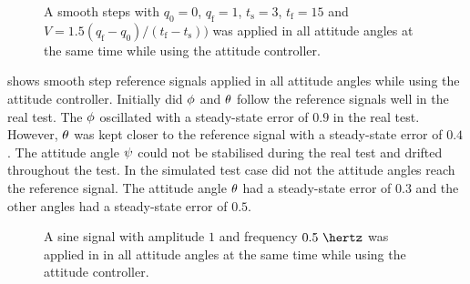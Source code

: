 \begin{figure}
\centering
  \qquad
  \qquad
  \qquad
  \qquad
  \qquad
  \caption{\label{fig:StepAllAttitude}%
 A smooth steps with $q_{\text{0}} = 0$, $q_{\text{f}} = 1$, $t_{\text{s}} = 3$, $t_{\text{f}} = 15$ and $V = 1.5 (q_{\text{f}} - q_{\text{0}})/(t_{\text{f}} - t_{\text{s}}))$ was applied in all attitude angles at the same time while using the attitude controller.}
\end{figure}

 shows smooth step reference signals applied in all attitude angles while using the attitude controller. Initially did $\phi$ and $\theta$ follow the reference signals well in the real test. The $\phi$ oscillated with a steady-state error of $0.9$ in the real test. However, $\theta$ was kept closer to the reference signal with a steady-state error of $0.4$. The attitude angle $\psi$ could not be stabilised during the real test and drifted throughout the test. In the simulated test case did not the attitude angles reach the reference signal. The attitude angle $\theta$ had a steady-state error of $0.3$ and the other angles had a steady-state error of $0.5$.

\begin{figure}
\centering
  \qquad
  \qquad
  \qquad
  \qquad
  \qquad
  \caption{\label{fig:SinAllAttitude}%
   A sine signal with amplitude $1$ and frequency $0.5\ \hertz$ was applied in in all attitude angles at the same time while using the attitude controller.}
\end{figure}

